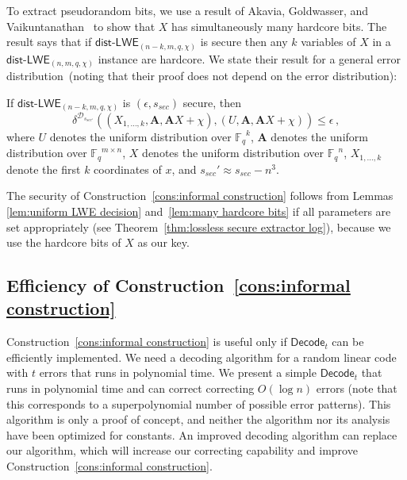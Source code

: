 \documentclass{llncs}
\newcommand{\thref}[1]{\mbox{Theorem~\ref{#1}}}
\newcommand{\consref}[1]{\mbox{Construction~\ref{#1}}}
\newcommand{\class}[1]{{\ensuremath{\mathsf{#1}}}}
\newcommand{\vect}[1]{\ensuremath{\mathbf{#1}}}
\newcommand{\Fq}{\ensuremath{\mathbb{F}_q}}
\newcommand{\decode}{\ensuremath{\mathsf{Decode}}}
\newcommand{\distLWE}{\ensuremath{\class{dist\mbox{-}LWE}}}
\newcommand{\vA}{\vect{A}}
\begin{document}
To extract pseudorandom bits, we use a result of Akavia, Goldwasser, and Vaikuntanathan~\cite{akavia2009} to show that $X$ has simultaneously many hardcore bits.  The result says that if $\distLWE_{(n-k, m, q, \chi)}$ is secure then any $k$ variables of $X$ in a $\distLWE_{(n, m, q, \chi)}$ instance are hardcore.  We state their result for a general error distribution~(noting that their proof does not depend on the error distribution):
\begin{lemma}
\label{lem:many hardcore bits}
 If $\distLWE_{(n-k, m, q, \chi)}$ is $(\epsilon, s_{sec})$ secure, then
\[\delta^ {\mathcal{D}_{s_{sec'}}} ((X_{1,\dots, k}, \vA, \vA X+\chi) , (U, \vA, \vA X+\chi)) \le \epsilon\,,\]
where $U$ denotes the uniform distribution over $\Fq^k$,  $\vA$ denotes the uniform distribution over $\Fq^{m\times n}$, $X$ denotes the uniform distribution over $\Fq^n$, $X_{1,\dots, k}$ denote the first $k$ coordinates of $x$, and $s_{sec}' \approx s_{sec} - n^3$.
\end{lemma}
The security of  \consref{cons:informal construction} follows from Lemmas \ref{lem:uniform LWE decision} and~\ref{lem:many hardcore bits} if all parameters are set appropriately (see \thref{thm:lossless secure extractor log}),  because we use the hardcore bits of $X$ as our key.  

\subsection{Efficiency of \consref{cons:informal construction}}
\label{sec:time main construction}
\consref{cons:informal construction} is useful only if $\decode_t$ can be efficiently implemented.  We need a decoding algorithm for a random linear code with $t$ errors that runs in polynomial time.  We present a simple $\decode_t$ that runs in polynomial time and can correct
correcting $O(\log n)$ errors (note that this corresponds to a superpolynomial number of possible error patterns).
This algorithm is only a proof of concept, and neither the algorithm nor its analysis have been optimized for constants. An improved decoding algorithm can replace our algorithm, which will increase our correcting capability and improve \consref{cons:informal construction}.
\end{document}
